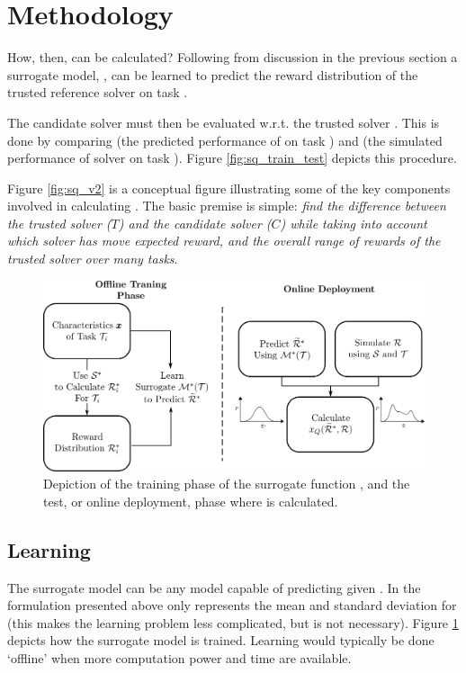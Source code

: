 \section{Methodology}
How, then, can \xQ{} be calculated? Following from discussion in the previous section a surrogate model, \surrogate{}, can be learned to predict the reward distribution \rwdstarapprox{} of the trusted reference solver \solvestar{} on task \task{}.

The candidate solver \solve{} must then be evaluated w.r.t. the trusted solver \solvestar{}. This is done by comparing \rwdstarapprox{} (the predicted performance of \solvestar{} on task \task) and \rwd{} (the simulated performance of solver \solve{} on task \task). Figure \ref{fig:sq_train_test} depicts this procedure.

Figure \ref{fig:sq_v2} is a conceptual figure illustrating some of the key components involved in calculating \xQ. The basic premise is simple: \emph{find the difference between the trusted solver ($T$) and the candidate solver ($C$) while taking into account which solver has move expected reward, and the overall range of rewards of the trusted solver over many tasks}.

\begin{figure}[tb]
    \centering
    \includegraphics[width=0.95\linewidth]{Figures/SQ_train_test.png}
    \caption{Depiction of the training phase of the surrogate function \surrogate, and the test, or online deployment, phase where \xQ{} is calculated.}
    \label{fig:sq_train}
\end{figure}%

\subsection{Learning \surrogate}
The surrogate model \surrogate{} can be any model capable of predicting \rwdstarapprox{} given \task. In the formulation presented above \rwdstariapprox{} only represents the mean and standard deviation for \rwdstari{} (this makes the learning problem less complicated, but is not necessary). Figure \ref{fig:sq_train} depicts how the surrogate model is trained. Learning \surrogate{} would typically be done `offline' when more computation power and time are available.

